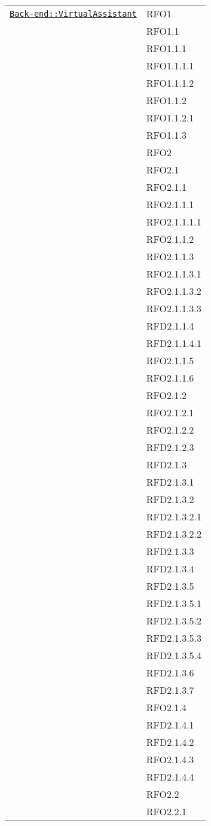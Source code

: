 \begin{longtable}{|>{\centering}m{10cm}|m{3cm}<{\centering}|}
\hyperref[Back-end::VirtualAssistant]{\texttt{Back-end::VirtualAssistant}} & RFO1\\
& RFO1.1\\
& RFO1.1.1\\
& RFO1.1.1.1\\
& RFO1.1.1.2\\
& RFO1.1.2\\
& RFO1.1.2.1\\
& RFO1.1.3\\
& RFO2\\
& RFO2.1\\
& RFO2.1.1\\
& RFO2.1.1.1\\
& RFO2.1.1.1.1\\
& RFO2.1.1.2\\
& RFO2.1.1.3\\
& RFO2.1.1.3.1\\
& RFO2.1.1.3.2\\
& RFO2.1.1.3.3\\
& RFD2.1.1.4\\
& RFD2.1.1.4.1\\
& RFO2.1.1.5\\
& RFO2.1.1.6\\
& RFO2.1.2\\
& RFO2.1.2.1\\
& RFO2.1.2.2\\
& RFD2.1.2.3\\
& RFD2.1.3\\
& RFD2.1.3.1\\
& RFD2.1.3.2\\
& RFD2.1.3.2.1\\
& RFD2.1.3.2.2\\
& RFD2.1.3.3\\
& RFD2.1.3.4\\
& RFD2.1.3.5\\
& RFD2.1.3.5.1\\
& RFD2.1.3.5.2\\
& RFD2.1.3.5.3\\
& RFD2.1.3.5.4\\
& RFD2.1.3.6\\
& RFD2.1.3.7\\
& RFO2.1.4\\
& RFD2.1.4.1\\
& RFD2.1.4.2\\
& RFO2.1.4.3\\
& RFD2.1.4.4\\
& RFO2.2\\
& RFO2.2.1\\

\end{longtable}
